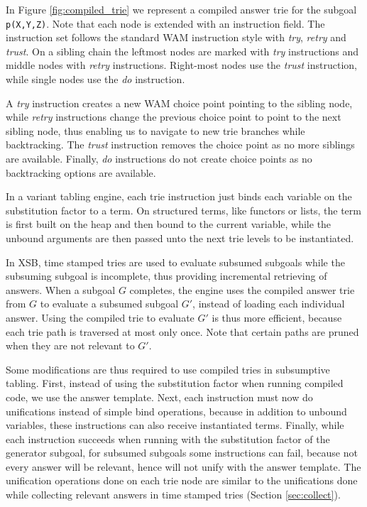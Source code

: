 In Figure \ref{fig:compiled_trie} we represent a compiled answer trie for the subgoal
\texttt{p(X,Y,Z)}. Note that each node is extended with an instruction field.
The instruction set follows the standard WAM instruction style with \textit{try},
\textit{retry} and \textit{trust}.
On a sibling chain the leftmost nodes are marked with \textit{try} instructions and middle
nodes with \textit{retry} instructions. Right-most nodes use the \textit{trust} instruction,
while single nodes use the \textit{do} instruction.

A \textit{try} instruction creates a new WAM choice point pointing to the sibling node,
while \textit{retry} instructions change the previous choice point to point to the next sibling node,
thus enabling us to navigate to new trie branches while backtracking. The \textit{trust}
instruction removes the choice point as no more siblings are available. Finally, \textit{do}
instructions do not create choice points as no backtracking options are available.

In a variant tabling engine, each trie instruction just binds each variable on the substitution factor to a term.
On structured terms, like functors or lists, the term is first built on the heap and then
bound to the current variable, while the unbound arguments are then passed unto the next trie levels
to be instantiated.

In XSB, time stamped tries are used to evaluate subsumed subgoals while the subsuming subgoal
is incomplete, thus providing incremental retrieving of answers.
When a subgoal $G$ completes, the engine uses the compiled answer trie from $G$
to evaluate a subsumed subgoal $G'$, instead of loading each individual answer.
Using the compiled trie to evaluate $G'$ is thus more efficient, because
each trie path is traversed at most only once. Note that certain paths are pruned when they
are not relevant to $G'$.

Some modifications are thus required to use compiled tries in subsumptive tabling. First,
instead of using the substitution factor when running compiled code, we use the answer template.
Next, each instruction must now do unifications instead of simple bind operations,
because in addition to unbound variables, these instructions can also receive instantiated terms.
Finally, while each instruction succeeds when running with the substitution factor of the generator
subgoal, for subsumed subgoals some instructions can fail, because not every answer will be relevant,
hence will not unify with the answer template. The unification operations done on each trie node
are similar to the unifications done while collecting relevant answers in time stamped tries
(Section \ref{sec:collect}).

